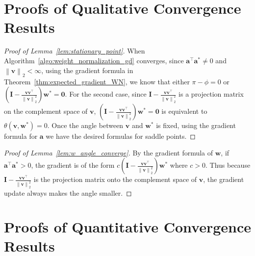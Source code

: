 \documentclass{article}
\newcommand{\firstlayer}{w}
\newcommand{\firstlayerWN}{v}
\newcommand{\secondlayer}{a}
\newcommand{\mat}[1]{\mathbf{#1}}
\newcommand{\vect}[1]{\mathbf{#1}}
\newcommand{\norm}[1]{\left\|#1\right\|}
\begin{document}
\section{Proofs of Qualitative Convergence Results}
\label{sec:proof_qualitative}
\begin{proof}[Proof of Lemma~\ref{lem:stationary_point}]
When Algorithm~\ref{algo:weight_normalization_gd} converges, since $\vect{\secondlayer}^\top \vect{\secondlayer}^* \neq 0$ and $\norm{\vect{\firstlayerWN}}_2 < \infty$, using the gradient formula in Theorem~\ref{thm:expected_gradient_WN}, we know that either $\pi-\phi = 0$ or 
$\left(\mat{I} -\frac{\vect{\firstlayerWN}\vect{\firstlayerWN}^\top}{\norm{\vect{\firstlayerWN}}_2^2}\right)\vect{\firstlayer}^*=\vect{0}.$
For the second case, since $\mat{I} -\frac{\vect{\firstlayerWN}\vect{\firstlayerWN}^\top}{\norm{\vect{\firstlayerWN}}_2^2}$ is a projection matrix on the complement space of $\vect{\firstlayerWN}$, $\left(\mat{I} -\frac{\vect{\firstlayerWN}\vect{\firstlayerWN}^\top}{\norm{\vect{\firstlayerWN}}_2^2}\right)\vect{\firstlayer}^*=\vect{0}$ is equivalent to $\theta\left(\vect{\firstlayerWN},\vect{\firstlayer}^*\right)=0$.
Once the angle between $\vect{\firstlayerWN}$ and $\vect{\firstlayer}^*$ is fixed, using the gradient formula for $\vect{\secondlayer}$ we have the desired formulas for saddle points.
\end{proof}\begin{proof}[Proof of Lemma~\ref{lem:w_angle_converge}]
By the gradient formula of $\vect{w}$, if $\vect{\secondlayer}^\top \vect{\secondlayer}^* > 0$, the gradient is of the form $c\left(\mat{I} -\frac{\vect{\firstlayerWN}\vect{\firstlayerWN}^\top}{\norm{\vect{\firstlayerWN}}_2^2}\right)\vect{w}^*$ where $c > 0$.
Thus because $\mat{I} -\frac{\vect{\firstlayerWN}\vect{\firstlayerWN}^\top}{\norm{\vect{\firstlayerWN}}_2^2}$ is the projection matrix onto the complement space of $\vect{\firstlayerWN}$, the gradient update always makes the angle smaller. 
\end{proof}

\section{Proofs of Quantitative Convergence Results}
\label{sec:proof_dynamics}
\end{document}
